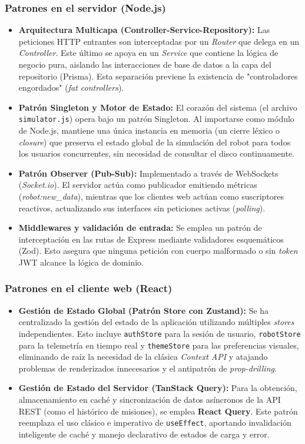\subsubsection{Patrones en el servidor (Node.js)}
\begin{itemize}
    \item \textbf{Arquitectura Multicapa (Controller-Service-Repository):} Las peticiones HTTP entrantes son interceptadas por un \textit{Router} que delega en un \textit{Controller}. Este último se apoya en un \textit{Service} que contiene la lógica de negocio pura, aislando las interacciones de base de datos a la capa del repositorio (Prisma). Esta separación previene la existencia de "controladores engordados" (\textit{fat controllers}).
    \item \textbf{Patrón Singleton y Motor de Estado:} El corazón del sistema (el archivo \texttt{simulator.js}) opera bajo un patrón Singleton. Al importarse como módulo de Node.js, mantiene una única instancia en memoria (un cierre léxico o \textit{closure}) que preserva el estado global de la simulación del robot para todos los usuarios concurrentes, sin necesidad de consultar el disco continuamente.
    \item \textbf{Patrón Observer (Pub-Sub):} Implementado a través de WebSockets (\textit{Socket.io}). El servidor actúa como publicador emitiendo métricas (\textit{robot:new\_data}), mientras que los clientes web actúan como suscriptores reactivos, actualizando sus interfaces sin peticiones activas (\textit{polling}).
    \item \textbf{Middlewares y validación de entrada:} Se emplea un patrón de interceptación en las rutas de Express mediante validadores esquemáticos (Zod). Esto asegura que ninguna petición con cuerpo malformado o sin \textit{token} JWT alcance la lógica de dominio.
\end{itemize}

\subsubsection{Patrones en el cliente web (React)}
\begin{itemize}
    \item \textbf{Gestión de Estado Global (Patrón Store con Zustand):} Se ha centralizado la gestión del estado de la aplicación utilizando múltiples \textit{stores} independientes. Esto incluye \texttt{authStore} para la sesión de usuario, \texttt{robotStore} para la telemetría en tiempo real y \texttt{themeStore} para las preferencias visuales, eliminando de raíz la necesidad de la clásica \textit{Context API} y atajando problemas de renderizados innecesarios y el antipatrón de \textit{prop-drilling}.
    \item \textbf{Gestión de Estado del Servidor (TanStack Query):} Para la obtención, almacenamiento en caché y sincronización de datos asíncronos de la API REST (como el histórico de misiones), se emplea \textbf{React Query}. Este patrón reemplaza el uso clásico e imperativo de \texttt{useEffect}, aportando invalidación inteligente de caché y manejo declarativo de estados de carga y error.
\end{itemize}


